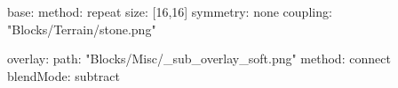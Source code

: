 base:
  method: repeat
  size: [16,16]
  symmetry: none
  coupling: "Blocks/Terrain/stone.png"

overlay:
  path: "Blocks/Misc/_sub_overlay_soft.png"
  method: connect
blendMode: subtract
